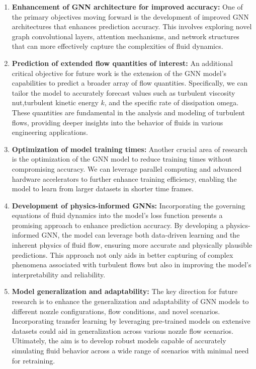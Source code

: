 \begin{enumerate}

    \item \textbf{Enhancement of GNN architecture for improved accuracy:} One of the primary objectives moving forward is the development of  improved GNN architectures that enhances prediction accuracy. This involves exploring novel graph convolutional layers, attention mechanisms, and network structures that can more effectively capture the complexities of fluid dynamics. 
    \item \textbf{Prediction of extended flow quantities of interest:} An additional critical objective for future work is the extension of the GNN model's capabilities to predict a broader array of flow quantities. Specifically, we can tailor the model to accurately forecast values such as turbulent viscosity \gls{nut},turbulent kinetic energy $k$, and the specific rate of dissipation \gls{omega}. These quantities are fundamental in the analysis and modeling of turbulent flows, providing deeper insights into the behavior of fluids in various engineering applications.    
    \item \textbf{Optimization of model training times:} Another crucial area of research is the optimization of the GNN model to reduce training times without compromising accuracy. We can leverage parallel computing and advanced hardware accelerators to further enhance training efficiency, enabling the model to learn from larger datasets in shorter time frames.
    
    \item \textbf{Development of physics-informed GNNs:} Incorporating the governing equations of fluid dynamics into the model's loss function presents a promising approach to enhance prediction accuracy. By developing a physics-informed GNN, the model can leverage both data-driven learning and the inherent physics of fluid flow, ensuring more accurate and physically plausible predictions. This approach not only aids in better capturing of complex phenomena associated with turbulent flows but also in improving the model's interpretability and reliability.
    \item \textbf{Model generalization and adaptability:} 
    The key direction for future research is to enhance the generalization and adaptability of GNN models to different nozzle configurations, flow conditions, and novel scenarios. Incorporating transfer learning by leveraging pre-trained models on extensive datasets could aid in generalization across various nozzle flow scenarios. Ultimately, the aim is to develop robust models capable of accurately simulating fluid behavior across a wide range of scenarios with minimal need for retraining. 

       
\end{enumerate}
